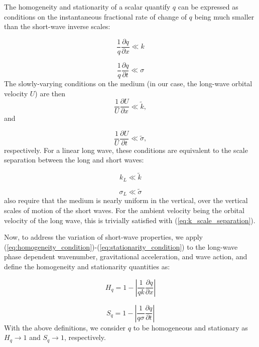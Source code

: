 \documentclass[lineno]{jfm}
\begin{document}
The homogeneity and stationarity of a scalar quantify $q$ can be expressed as
conditions on the instantaneous fractional rate of change of $q$ being much
smaller than the short-wave inverse scales:

\begin{equation}
  \frac{1}{q} \frac{\partial q}{\partial x} \ll k
  \label{eq:homogeneity_condition}
\end{equation}

\begin{equation}
  \frac{1}{q} \frac{\partial q}{\partial t} \ll \sigma
  \label{eq:stationarity_condition}
\end{equation}
The slowly-varying conditions on the medium (in our case, the long-wave orbital
velocity $U$) are then
\begin{equation}
  \frac{1}{U} \frac{\partial U}{\partial x} \ll \widetilde{k},
\end{equation}
and

\begin{equation}
  \frac{1}{U} \frac{\partial U}{\partial t} \ll \widetilde{\sigma},
\end{equation}
respectively.
For a linear long wave, these conditions are equivalent to the scale separation
between the long and short waves:

\begin{equation}
  k_L \ll \widetilde{k}
  \label{eq:k_scale_separation}
\end{equation}

\begin{equation}
  \sigma_L \ll \widetilde{\sigma}
\end{equation}
\citet{bretherton1968wavetrains} also require that the medium is nearly uniform
in the vertical, over the vertical scales of motion of the short waves.
For the ambient velocity being the orbital velocity of the long wave, this is
trivially satisfied with (\ref{eq:k_scale_separation}).

Now, to address the variation of short-wave properties,
we apply (\ref{eq:homogeneity_condition})-(\ref{eq:stationarity_condition}) to
the long-wave phase dependent wavenumber, gravitational acceleration, and
wave action, and define the homogeneity and stationarity quantities as:

\begin{equation}
  H_q = 1 - \left| \frac{1}{qk} \frac{\partial q}{\partial x} \right|
\end{equation}

\begin{equation}
  S_q = 1 - \left| \frac{1}{q\sigma} \frac{\partial q}{\partial t} \right|
\end{equation}
With the above definitions, we consider $q$ to be homogeneous and stationary as
$H_q \rightarrow 1$ and $S_q \rightarrow 1$, respectively.
\end{document}
